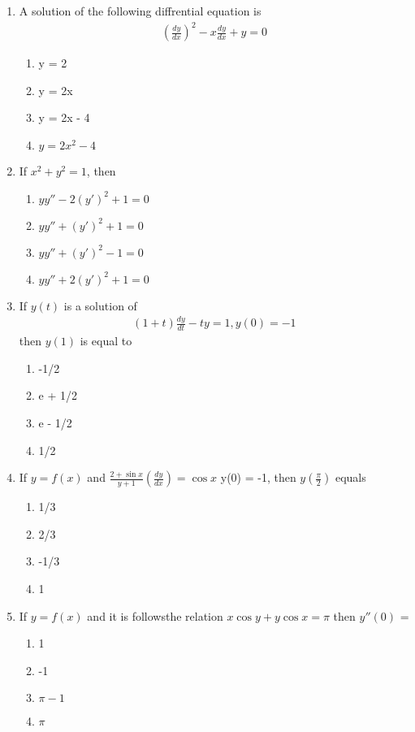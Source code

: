 \renewcommand{\theequation}{\theenumi}
\begin{enumerate}[label=\arabic*.,ref=\thesubsection.\theenumi]

\item A solution of the following diffrential equation is
\begin{align*}
\left(\frac{dy}{dx}\right)^{2} - x\frac{dy}{dx} + y = 0
\end{align*}
\begin{enumerate}
\item y = 2
\item y = 2x
\item y = 2x - 4
\item $y = 2x^2 - 4$
\end{enumerate}

\item If $x^2 + y^2 = 1$, then
\begin{enumerate}
\item $yy'' - 2(y')^{2} + 1 = 0$
\item $yy'' + (y')^{2} + 1 = 0$
\item $yy'' + (y')^{2} - 1 = 0$
\item $yy'' + 2(y')^{2} + 1 = 0$
\end{enumerate}

\item If $y(t)$ is a solution of
\begin{align*}
(1 + t)\frac{dy}{dt} - ty = 1, y(0) = -1
\end{align*}
then $y(1)$ is equal to
\begin{enumerate}
\item -1/2
\item e + 1/2
\item e - 1/2
\item 1/2
\end{enumerate}

\item If $y = f(x)$ and $\frac{2 + \sin x}{y + 1}\left(\frac{dy}{dx}\right) = \cos x$
y(0) = -1, then $y\left(\frac{\pi}{2}\right)$ equals
\begin{enumerate}
\item 1/3
\item 2/3
\item -1/3
\item 1
\end{enumerate}

\item If $y = f(x)$ and it is followsthe relation $x\cos y + y\cos x = \pi$ then $y''(0)$ = 
\begin{enumerate}
\item 1
\item -1
\item $\pi - 1$
\item $\pi$
\end{enumerate}


\end{enumerate}

